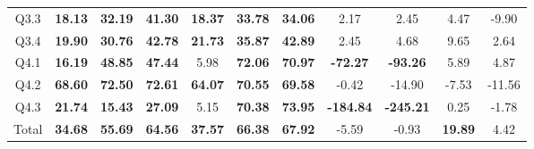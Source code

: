 \begin{table}
{\begin{tabular}{@{}ccccccccccc@{}}
    Q3.3                       & \multicolumn{1}{c}{\textbf{18.13}}            & \multicolumn{1}{c}{\textbf{32.19}}            & \textbf{41.30}            & \multicolumn{1}{c}{\textbf{18.37}}            & \multicolumn{1}{c}{\textbf{33.78}}            & \textbf{34.06}            & \multicolumn{1}{c}{2.17}             & \multicolumn{1}{c}{2.45}             & \multicolumn{1}{c}{4.47}            & -9.90                           \\ 
    Q3.4                       & \multicolumn{1}{c}{\textbf{19.90}}            & \multicolumn{1}{c}{\textbf{30.76}}            & \textbf{42.78}            & \multicolumn{1}{c}{\textbf{21.73}}            & \multicolumn{1}{c}{\textbf{35.87}}            & \textbf{42.89}            & \multicolumn{1}{c}{2.45}             & \multicolumn{1}{c}{4.68}             & \multicolumn{1}{c}{9.65}            & 2.64                            \\ 
    Q4.1                       & \multicolumn{1}{c}{\textbf{16.19}}            & \multicolumn{1}{c}{\textbf{48.85}}            & \textbf{47.44}            & \multicolumn{1}{c}{5.98}                      & \multicolumn{1}{c}{\textbf{72.06}}            & \textbf{70.97}            & \multicolumn{1}{c}{\textbf{-72.27}}  & \multicolumn{1}{c}{\textbf{-93.26}}  & \multicolumn{1}{c}{5.89}            & 4.87                            \\ 
    Q4.2                       & \multicolumn{1}{c}{\textbf{68.60}}            & \multicolumn{1}{c}{\textbf{72.50}}            & \textbf{72.61}            & \multicolumn{1}{c}{\textbf{64.07}}            & \multicolumn{1}{c}{\textbf{70.55}}            & \textbf{69.58}            & \multicolumn{1}{c}{-0.42}            & \multicolumn{1}{c}{-14.90}           & \multicolumn{1}{c}{-7.53}           & -11.56                          \\ 
    Q4.3                       & \multicolumn{1}{c}{\textbf{21.74}}            & \multicolumn{1}{c}{\textbf{15.43}}            & \textbf{27.09}            & \multicolumn{1}{c}{5.15}                      & \multicolumn{1}{c}{\textbf{70.38}}            & \textbf{73.95}            & \multicolumn{1}{c}{\textbf{-184.84}} & \multicolumn{1}{c}{\textbf{-245.21}} & \multicolumn{1}{c}{0.25}            & -1.78                           \\ 
    Total                      & \multicolumn{1}{c}{\textbf{34.68}}            & \multicolumn{1}{c}{\textbf{55.69}}            & \textbf{64.56}            & \multicolumn{1}{c}{\textbf{37.57}}            & \multicolumn{1}{c}{\textbf{66.38}}            & \textbf{67.92}            & \multicolumn{1}{c}{-5.59}            & \multicolumn{1}{c}{-0.93}            & \multicolumn{1}{c}{\textbf{19.89}}  & 4.42                            \\ \bottomrule
    \end{tabular}%
    }
    \end{table}

